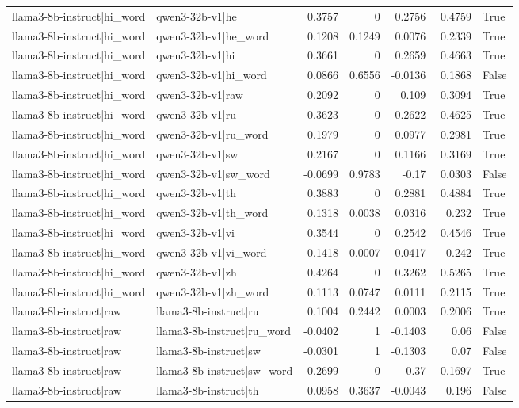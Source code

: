 \begin{table}
\begin{tabular}{l l r r r r l}
llama3-8b-instruct|hi_word & qwen3-32b-v1|he & 0.3757 & 0 & 0.2756 & 0.4759 & True \\
llama3-8b-instruct|hi_word & qwen3-32b-v1|he_word & 0.1208 & 0.1249 & 0.0076 & 0.2339 & True \\
llama3-8b-instruct|hi_word & qwen3-32b-v1|hi & 0.3661 & 0 & 0.2659 & 0.4663 & True \\
llama3-8b-instruct|hi_word & qwen3-32b-v1|hi_word & 0.0866 & 0.6556 & -0.0136 & 0.1868 & False \\
llama3-8b-instruct|hi_word & qwen3-32b-v1|raw & 0.2092 & 0 & 0.109 & 0.3094 & True \\
llama3-8b-instruct|hi_word & qwen3-32b-v1|ru & 0.3623 & 0 & 0.2622 & 0.4625 & True \\
llama3-8b-instruct|hi_word & qwen3-32b-v1|ru_word & 0.1979 & 0 & 0.0977 & 0.2981 & True \\
llama3-8b-instruct|hi_word & qwen3-32b-v1|sw & 0.2167 & 0 & 0.1166 & 0.3169 & True \\
llama3-8b-instruct|hi_word & qwen3-32b-v1|sw_word & -0.0699 & 0.9783 & -0.17 & 0.0303 & False \\
llama3-8b-instruct|hi_word & qwen3-32b-v1|th & 0.3883 & 0 & 0.2881 & 0.4884 & True \\
llama3-8b-instruct|hi_word & qwen3-32b-v1|th_word & 0.1318 & 0.0038 & 0.0316 & 0.232 & True \\
llama3-8b-instruct|hi_word & qwen3-32b-v1|vi & 0.3544 & 0 & 0.2542 & 0.4546 & True \\
llama3-8b-instruct|hi_word & qwen3-32b-v1|vi_word & 0.1418 & 0.0007 & 0.0417 & 0.242 & True \\
llama3-8b-instruct|hi_word & qwen3-32b-v1|zh & 0.4264 & 0 & 0.3262 & 0.5265 & True \\
llama3-8b-instruct|hi_word & qwen3-32b-v1|zh_word & 0.1113 & 0.0747 & 0.0111 & 0.2115 & True \\
llama3-8b-instruct|raw & llama3-8b-instruct|ru & 0.1004 & 0.2442 & 0.0003 & 0.2006 & True \\
llama3-8b-instruct|raw & llama3-8b-instruct|ru_word & -0.0402 & 1 & -0.1403 & 0.06 & False \\
llama3-8b-instruct|raw & llama3-8b-instruct|sw & -0.0301 & 1 & -0.1303 & 0.07 & False \\
llama3-8b-instruct|raw & llama3-8b-instruct|sw_word & -0.2699 & 0 & -0.37 & -0.1697 & True \\
llama3-8b-instruct|raw & llama3-8b-instruct|th & 0.0958 & 0.3637 & -0.0043 & 0.196 & False \\

\end{tabular}
\end{table}
